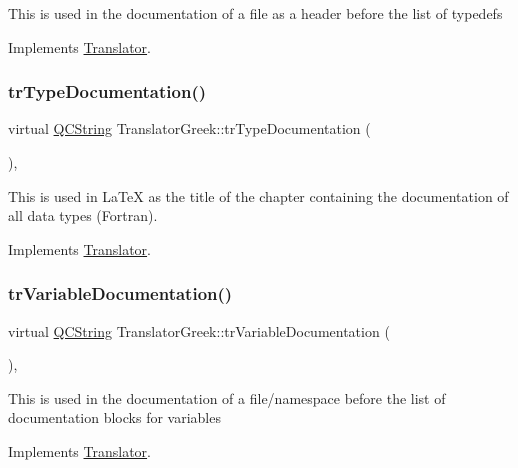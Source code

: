 This is used in the documentation of a file as a header before the list of typedefs 

Implements \mbox{\hyperlink{class_translator}{Translator}}.

\mbox{\label{class_translator_greek_adbf889d433a3a4b96cb5477884a61033}} 
\subsubsection{\texorpdfstring{trTypeDocumentation()}{trTypeDocumentation()}}
{\footnotesize\ttfamily virtual \mbox{\hyperlink{class_q_c_string}{Q\+C\+String}} Translator\+Greek\+::tr\+Type\+Documentation (\begin{DoxyParamCaption}{ }\end{DoxyParamCaption})\hspace{0.3cm}{\ttfamily [inline]}, {\ttfamily [virtual]}}

This is used in La\+TeX as the title of the chapter containing the documentation of all data types (Fortran). 

Implements \mbox{\hyperlink{class_translator}{Translator}}.

\mbox{\label{class_translator_greek_a5de7ff594f0fa5e5c9ca9d87ede6b0f3}} 
\subsubsection{\texorpdfstring{trVariableDocumentation()}{trVariableDocumentation()}}
{\footnotesize\ttfamily virtual \mbox{\hyperlink{class_q_c_string}{Q\+C\+String}} Translator\+Greek\+::tr\+Variable\+Documentation (\begin{DoxyParamCaption}{ }\end{DoxyParamCaption})\hspace{0.3cm}{\ttfamily [inline]}, {\ttfamily [virtual]}}

This is used in the documentation of a file/namespace before the list of documentation blocks for variables 

Implements \mbox{\hyperlink{class_translator}{Translator}}.


